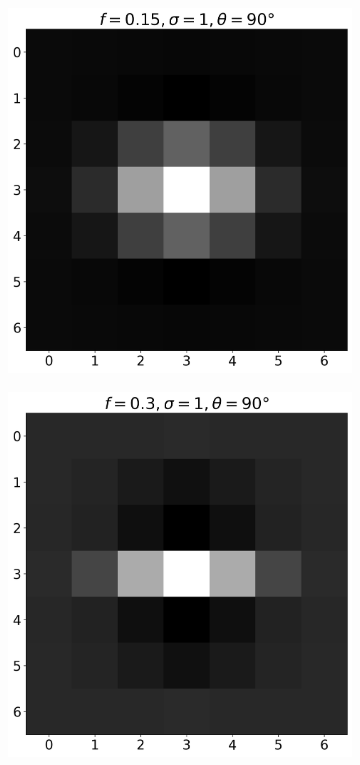 \documentclass[12pt,a4paper, english]{article}
\begin{document}
\begin{figure}[!htbp]
      \begin{subfigure}[b]{0.3\textwidth}
        \includegraphics[width=\textwidth]{img/K6.png}
      \end{subfigure}
      \begin{subfigure}[b]{0.3\textwidth}
        \includegraphics[width=\textwidth]{img/K7.png}

\end{subfigure}
\end{figure}
\end{document}
